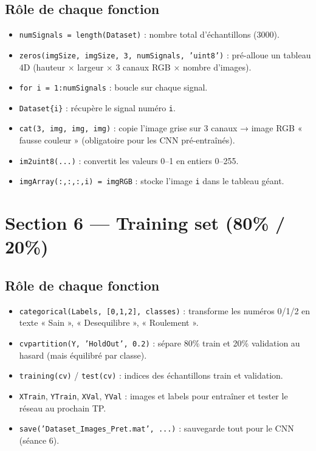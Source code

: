 ﻿\documentclass[11pt,a4paper]{article}
\begin{document}
\subsection{Rôle de chaque fonction}
\begin{itemize}
  \item \texttt{numSignals = length(Dataset)} : nombre total d'échantillons (3000).
  \item \texttt{zeros(imgSize, imgSize, 3, numSignals, 'uint8')} : pré-alloue un tableau 4D (hauteur × largeur × 3 canaux RGB × nombre d'images).
  \item \texttt{for i = 1:numSignals} : boucle sur chaque signal.
  \item \texttt{Dataset\{i\}} : récupère le signal numéro \texttt{i}.
  \item \texttt{cat(3, img, img, img)} : copie l'image grise sur 3 canaux → image RGB « fausse couleur » (obligatoire pour les CNN pré-entraînés).
  \item \texttt{im2uint8(...)} : convertit les valeurs 0--1 en entiers 0--255.
  \item \texttt{imgArray(:,:,:,i) = imgRGB} : stocke l'image \texttt{i} dans le tableau géant.
\end{itemize}

\section{Section 6 — Training set (80\% / 20\%)}

\subsection{Rôle de chaque fonction}
\begin{itemize}
  \item \texttt{categorical(Labels, [0,1,2], classes)} : transforme les numéros 0/1/2 en texte « Sain », « Desequilibre », « Roulement ».
  \item \texttt{cvpartition(Y, 'HoldOut', 0.2)} : sépare 80\% train et 20\% validation au hasard (mais équilibré par classe).
  \item \texttt{training(cv)} / \texttt{test(cv)} : indices des échantillons train et validation.
  \item \texttt{XTrain}, \texttt{YTrain}, \texttt{XVal}, \texttt{YVal} : images et labels pour entraîner et tester le réseau au prochain TP.
  \item \texttt{save('Dataset\_Images\_Pret.mat', ...)} : sauvegarde tout pour le CNN (séance 6).
\end{itemize}
\end{document}
